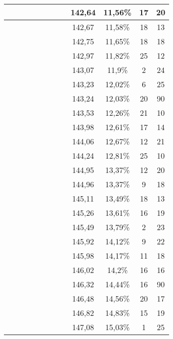 \begin{center}
\begin{longtable}{|c|c|c|c|c|c|c|c|c|c|c|c|}
 \x &  \x &  &  \x &  &  \x &  &  \x & 142,64 & 11,56\% & 17 & 20  \\ \hline
 \x &  &  \x &  &  &  \x &  &  \x & 142,67 & 11,58\% & 18 & 13  \\ \hline
 \x &  \x &  \x &  &  \x &  &  &  & 142,75 & 11,65\% & 18 & 18  \\ \hline
 \x &  &  \x &  \x &  \x &  \x &  &  \x & 142,97 & 11,82\% & 25 & 12  \\ \hline
 \x &  \x &  &  &  \x &  &  &  \x & 143,07 & 11,9\% & 2 & 24  \\ \hline
 \x &  \x &  \x &  &  &  &  \x &  \x & 143,23 & 12,02\% & 6 & 25  \\ \hline
 \x &  &  \x &  \x &  &  \x &  &  \x & 143,24 & 12,03\% & 20 & 90  \\ \hline
 \x &  \x &  &  \x &  &  &  &  \x & 143,53 & 12,26\% & 21 & 10  \\ \hline
 \x &  \x &  &  &  \x &  &  &  & 143,98 & 12,61\% & 17 & 14  \\ \hline
 \x &  \x &  \x &  &  \x &  &  &  \x & 144,06 & 12,67\% & 12 & 21  \\ \hline
 \x &  \x &  \x &  &  &  \x &  \x &  & 144,24 & 12,81\% & 25 & 10  \\ \hline
 \x &  &  &  \x &  \x &  \x &  &  & 144,95 & 13,37\% & 12 & 20  \\ \hline
 \x &  \x &  \x &  &  \x &  \x &  &  & 144,96 & 13,37\% & 9 & 18  \\ \hline
 \x &  &  &  &  &  \x &  &  \x & 145,11 & 13,49\% & 18 & 13  \\ \hline
 \x &  \x &  &  \x &  \x &  \x &  &  & 145,26 & 13,61\% & 16 & 19  \\ \hline
 \x &  \x &  \x &  \x &  &  &  &  \x & 145,49 & 13,79\% & 2 & 23  \\ \hline
 \x &  &  \x &  &  \x &  \x &  \x &  & 145,92 & 14,12\% & 9 & 22  \\ \hline
 \x &  &  \x &  &  \x &  &  \x &  \x & 145,98 & 14,17\% & 11 & 18  \\ \hline
 \x &  &  \x &  &  &  &  \x &  \x & 146,02 & 14,2\% & 16 & 16  \\ \hline
 \x &  \x &  \x &  \x &  &  &  \x &  \x & 146,32 & 14,44\% & 16 & 90  \\ \hline
 \x &  &  \x &  \x &  &  &  &  \x & 146,48 & 14,56\% & 20 & 17  \\ \hline
 \x &  &  \x &  &  \x &  &  &  & 146,82 & 14,83\% & 15 & 19  \\ \hline
 \x &  \x &  &  &  &  &  \x &  \x & 147,08 & 15,03\% & 1 & 25  \\ \hline

\end{longtable}
\end{center}
